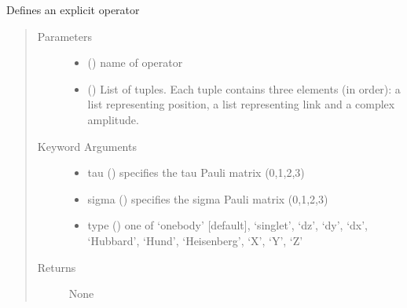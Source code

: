 \documentclass[letterpaper,10pt,english]{sphinxmanual}
\begin{document}
\begin{fulllineitems}
\label{\detokenize{functions:pyqcm.explicit_operator}}
\sphinxAtStartPar
Defines an explicit operator
\begin{quote}\begin{description}
\item[{Parameters}] \leavevmode\begin{itemize}
\item {} 
\sphinxAtStartPar
{} () \textendash{} name of operator

\item {} 
\sphinxAtStartPar
{} (\sphinxstyleliteralemphasis{\sphinxupquote{{[}}}\sphinxstyleliteralemphasis{\sphinxupquote{(}}\sphinxstyleliteralemphasis{\sphinxupquote{, }}\sphinxstyleliteralemphasis{\sphinxupquote{, }}\sphinxstyleliteralemphasis{\sphinxupquote{)}}\sphinxstyleliteralemphasis{\sphinxupquote{{]}}}) \textendash{} List of tuples. Each tuple contains three elements (in order): a list representing position, a list representing link and a complex amplitude.

\end{itemize}

\item[{Keyword Arguments}] \leavevmode\begin{itemize}
\item {} 
\sphinxAtStartPar
tau () \textendash{} specifies the tau Pauli matrix  (0,1,2,3)

\item {} 
\sphinxAtStartPar
sigma () \textendash{} specifies the sigma Pauli matrix  (0,1,2,3)

\item {} 
\sphinxAtStartPar
type () \textendash{} one of ‘one\sphinxhyphen{}body’ {[}default{]}, ‘singlet’, ‘dz’, ‘dy’, ‘dx’, ‘Hubbard’, ‘Hund’, ‘Heisenberg’, ‘X’, ‘Y’, ‘Z’

\end{itemize}

\item[{Returns}] \leavevmode
\sphinxAtStartPar
None

\end{description}\end{quote}

\end{fulllineitems}
\end{document}
